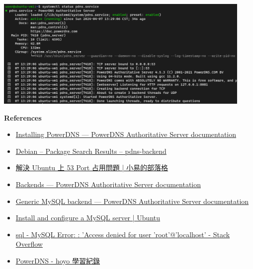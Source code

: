 \documentclass[12pt, a4paper]{article}
\begin{document}
\begin{enumerate}
    \includegraphics[width=0.93\textwidth]{4-1_status_pdns.png}

    \textbf{References}
    \begin{itemize}
      \item \href{https://doc.powerdns.com/authoritative/installation.html}{Installing PowerDNS — PowerDNS Authoritative Server  documentation}
      \item \href{https://packages.debian.org/search?keywords=pdns-backend}{Debian -- Package Search Results -- pdns-backend}
      \item \href{https://blog.steveyi.net/posts/ubuntu-53-port-already-in-use/}{解決 Ubuntu 上 53 Port 占用問題 | 小易的部落格}
      \item \href{https://doc.powerdns.com/authoritative/backends/index.html}{Backends — PowerDNS Authoritative Server  documentation}
      \item \href{https://doc.powerdns.com/authoritative/backends/generic-mysql.html}{Generic MySQL backend — PowerDNS Authoritative Server  documentation}
      \item \href{https://ubuntu.com/server/docs/databases-mysql}{Install and configure a MySQL server | Ubuntu}
      \item \href{https://stackoverflow.com/questions/41645309/mysql-error-access-denied-for-user-rootlocalhost}{sql - MySQL Error: : 'Access denied for user 'root'@'localhost' - Stack Overflow}
      \item \href{https://blog.hoyo.idv.tw/?p=10585}{PowerDNS - hoyo 學習紀錄}
    \end{itemize}


\end{enumerate}
\end{document}
